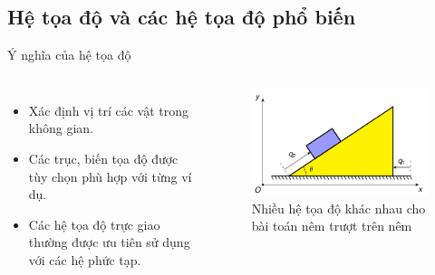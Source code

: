 \subsection{Hệ tọa độ và các hệ tọa độ phổ biến}

\begin{frame}{Ý nghĩa của hệ tọa độ}
    \begin{columns}
        \begin{itemize}
            \item Xác định vị trí các vật trong không gian.
            \item Các trục, biến tọa độ được tùy chọn phù hợp với từng ví dụ.
            \item Các hệ tọa độ trực giao thường được ưu tiên sử dụng với các hệ phức tạp.
        \end{itemize}
        \vspace{-4mm}
        \begin{figure}
            \centering
            \includegraphics[width=0.9\linewidth]{Figures/Sliding_wedge.pdf}
            \caption{Nhiều hệ tọa độ khác nhau cho bài toán nêm trượt trên nêm}
            \label{fig:Sliding_wedge}
        \end{figure}
    \end{columns}
\end{frame}

